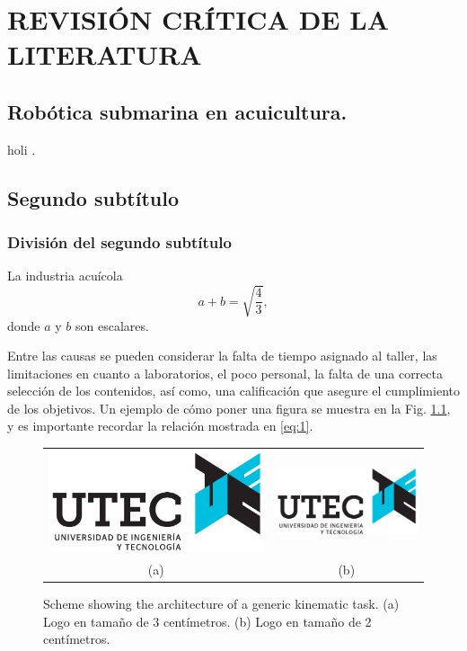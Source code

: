 \chapter{REVISIÓN CRÍTICA DE LA LITERATURA}

\section{Robótica submarina en acuicultura.}

holi \cite{Reumann2012}.

\section{Segundo subtítulo}

\subsection{División del segundo subtítulo}

La industria acuícola 
%
\begin{equation}
  \label{eq:1}
  a+b=\sqrt{\frac{4}{3}},
\end{equation}
%
donde $a$ y $b$ son escalares.

Entre las causas se pueden considerar la falta de tiempo asignado al taller,
las limitaciones en cuanto a laboratorios, el poco personal, la falta de una
correcta selección de los contenidos, así como, una calificación que asegure el
cumplimiento de los objetivos. Un ejemplo de cómo poner una figura se muestra en la Fig. \ref{fig:diagram2}, y es importante recordar la relación mostrada en \eqref{eq:1}.


\begin{figure} 
\begin{center}
\begin{tabular}{cc}
\includegraphics[height=3cm]{images/logo_utec.png} &
\includegraphics[height=2cm]{images/logo_utec.png} \\
(a) & (b)
\end{tabular}
\caption{\label{fig:diagram2}Scheme showing the architecture of a generic kinematic task. (a) Logo en tamaño de 3 centímetros. (b) Logo en tamaño de 2 centímetros.}
\end{center}
\end{figure}

